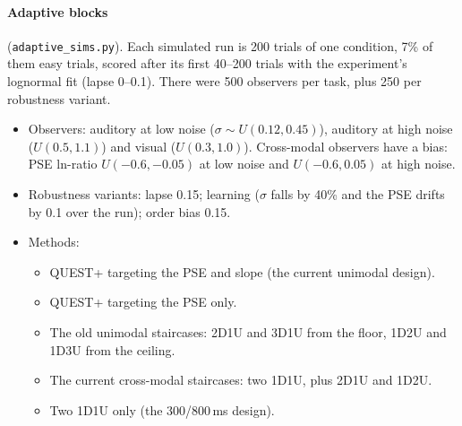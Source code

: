 \documentclass[11pt,a4paper]{article}
\begin{document}
\paragraph{Adaptive blocks} (\texttt{adaptive\_sims.py}). Each simulated run is 200 trials of one condition, 7\% of them easy trials, scored after its first 40--200 trials with the experiment's lognormal fit (lapse 0--0.1). There were 500 observers per task, plus 250 per robustness variant.
\begin{itemize}
\item Observers: auditory at low noise ($\sigma \sim U(0.12, 0.45)$), auditory at high noise ($U(0.5, 1.1)$) and visual ($U(0.3, 1.0)$). Cross-modal observers have a bias: PSE ln-ratio $U(-0.6, -0.05)$ at low noise and $U(-0.6, 0.05)$ at high noise.
\item Robustness variants: lapse 0.15; learning ($\sigma$ falls by 40\% and the PSE drifts by 0.1 over the run); order bias 0.15.
\item Methods:
  \begin{itemize}
  \item QUEST+ targeting the PSE and slope (the current unimodal design).
  \item QUEST+ targeting the PSE only.
  \item The old unimodal staircases: 2D1U and 3D1U from the floor, 1D2U and 1D3U from the ceiling.
  \item The current cross-modal staircases: two 1D1U, plus 2D1U and 1D2U.
  \item Two 1D1U only (the 300/800\,ms design).
  \end{itemize}
\end{itemize}
\end{document}
